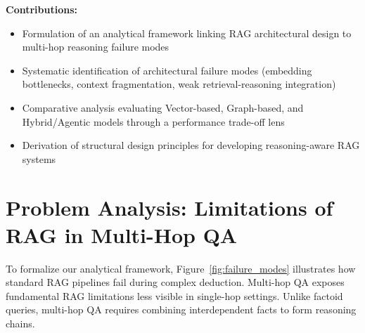 \documentclass[runningheads]{llncs}
\begin{document}
\textbf{Contributions:}
\begin{itemize}
\item Formulation of an analytical framework linking RAG architectural design to multi-hop reasoning failure modes
\item Systematic identification of architectural failure modes (embedding bottlenecks, context fragmentation, weak retrieval-reasoning integration)
\item Comparative analysis evaluating Vector-based, Graph-based, and Hybrid/Agentic models through a performance trade-off lens
\item Derivation of structural design principles for developing reasoning-aware RAG systems
\end{itemize}


\section{Problem Analysis: Limitations of RAG in Multi-Hop QA}

To formalize our analytical framework, Figure~\ref{fig:failure_modes} illustrates how standard RAG pipelines fail during complex deduction. Multi-hop QA exposes fundamental RAG limitations less visible in single-hop settings. Unlike factoid queries, multi-hop QA requires combining interdependent facts to form reasoning chains.
\end{document}
